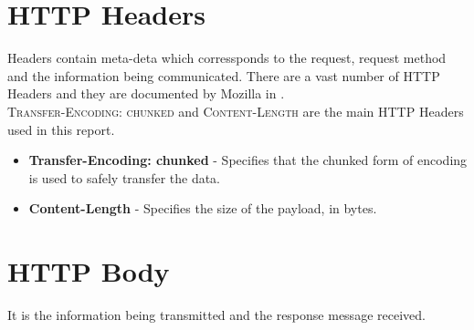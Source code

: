 \section{HTTP Headers}
Headers contain meta-deta which corressponds to the request, request method and the information being communicated. There are a vast number of HTTP Headers and they are documented by Mozilla in \cite{b17}.\\
\textsc{Transfer-Encoding: chunked} and \textsc{Content-Length} are the main HTTP Headers used in this report.
\begin{itemize}
	\item \textbf{Transfer-Encoding: chunked} \cite{b18} - Specifies that the chunked form of encoding is used to safely transfer the data.
	\item \textbf{Content-Length} \cite{b19} - Specifies the size of the payload, in bytes. 
\end{itemize}
\section{HTTP Body}
It is the information being transmitted and the response message received.